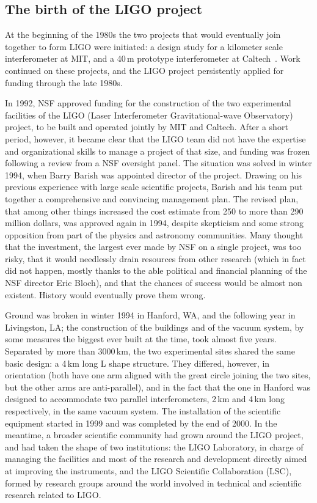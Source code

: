 \subsection{The birth of the LIGO project}
At the beginning of the 1980s the two projects that would eventually join together to form LIGO were initiated: 
a design study for a kilometer scale interferometer at MIT, and a 40\,m 
prototype interferometer at Caltech~\cite{Spero_1989}. Work continued on these projects, and the LIGO project persistently applied for funding through the late 1980s.

In 1992, NSF approved funding for the construction of the two experimental facilities of the LIGO (Laser Interferometer Gravitational-wave Observatory) project\cite{Abramovici_1992}, to be built and operated jointly by MIT and Caltech.
After a short period, however, it became clear that the LIGO team did not have the expertise and organizational skills to manage a project of that size, and funding was frozen following a review from a NSF oversight panel.
The situation was solved in winter 1994, when Barry Barish was appointed director of the project. Drawing on his previous experience with large scale scientific projects, Barish and his team put together a comprehensive and convincing management plan.
The revised plan, that among other things increased the cost estimate from 250 to more than 290 million dollars, was approved again in 1994, despite skepticism and some strong opposition from part of the physics and astronomy communities. 
Many thought that the investment, the largest ever made by NSF on a  single project, was too risky, that it would needlessly drain resources from other research (which in fact did not happen, mostly thanks to the able political and financial planning of the NSF director Eric Bloch), and that the chances of success would be almost non existent.
History would eventually prove them wrong.

Ground was broken in winter 1994 in Hanford, WA, and the following year in Livingston, LA; 
the construction of the buildings and of the vacuum system, by some measures the biggest 
ever built at the time, took almost five years. Separated by more than 3000\,km, the two 
experimental sites shared the same basic design: a 4\,km long L shape structure. They 
differed, however, in orientation (both have one arm aligned with the great circle joining the two sites, but the other arms are anti-parallel), and in the fact that the one in Hanford was 
designed to accommodate two parallel interferometers, 2\,km and 4\,km long respectively, in the same vacuum system. 
The installation of the scientific equipment started in 1999 and was completed by the end of 2000. 
In the meantime, a broader scientific community had grown around the LIGO project, 
and had taken the shape of two institutions: the LIGO Laboratory, in charge of managing 
the facilities and most of the research and development directly aimed at improving the 
instruments, and the LIGO Scientific Collaboration (LSC), formed by research groups 
around the world involved in technical and scientific research related to LIGO.

